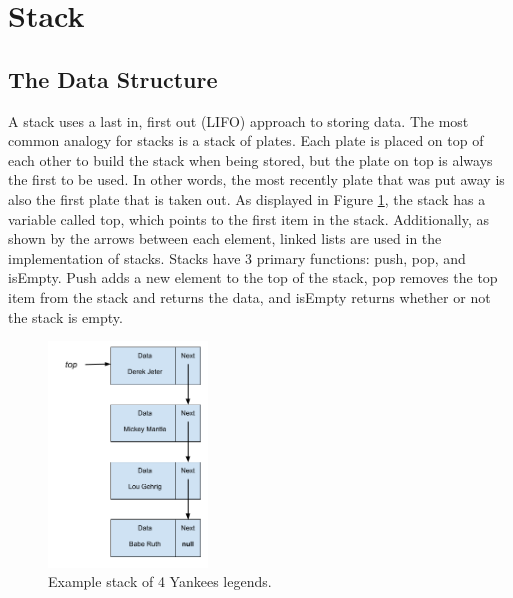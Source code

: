 \documentclass[letterpaper, 10pt,DIV=13]{scrartcl}
\numberwithin{equation}{section} %
\numberwithin{figure}{section} %
\numberwithin{table}{section} %
\begin{document}
\section{Stack}
\subsection{The Data Structure}\label{stackDataStructure}
A stack uses a last in, first out (LIFO) approach to storing data. The most common analogy for stacks is a stack of plates. Each plate is placed on top of each other to build the stack when being stored, but the plate on top is always the first to be used. In other words, the most recently plate that was put away is also the first plate that is taken out. As displayed in Figure \ref{figure:stack}, the stack has a variable called top, which points to the first item in the stack. Additionally, as shown by the arrows between each element, linked lists are used in the implementation of stacks. Stacks have 3 primary functions: push, pop, and isEmpty. Push adds a new element to the top of the stack, pop removes the top item from the stack and returns the data, and isEmpty returns whether or not the stack is empty.

\begin{figure}[ht] 
    \centering 
    \includegraphics[height=6cm]{stack}
    \caption{Example stack of 4 Yankees legends.}
    \label{figure:stack}
 \end{figure}
\end{document}
